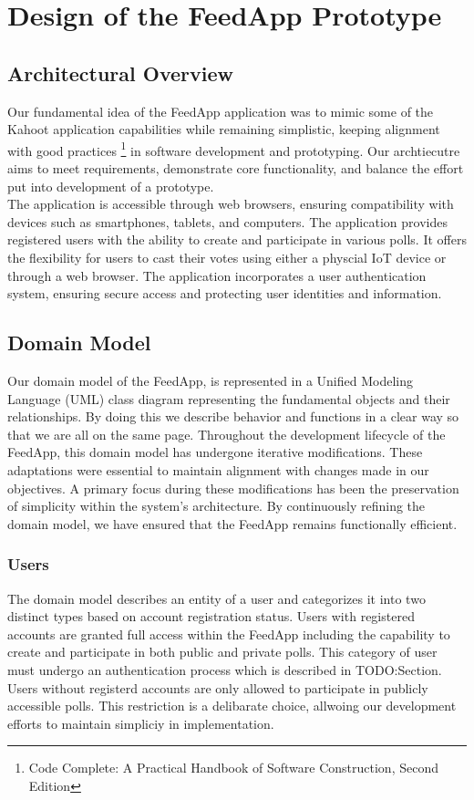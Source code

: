 \clearpage
\section{Design of the FeedApp Prototype}
\label{sec:design}

\subsection{Architectural Overview} 

Our fundamental idea of the FeedApp application was to mimic some of the Kahoot application capabilities while remaining simplistic, keeping alignment with good practices \footnote{Code Complete: A Practical Handbook of Software Construction, Second Edition } in software development and prototyping.  Our archtiecutre aims to meet requirements, demonstrate core functionality, and balance the effort put into development of a prototype.  \\

\noindent The application is accessible through web browsers, ensuring compatibility with devices such as smartphones, tablets, and computers.  The application provides registered users with the ability to create and participate in various polls.  It offers the flexibility for users to cast their votes using either a physcial IoT device or through a web browser.  The application incorporates a user authentication system, ensuring secure access and protecting user identities and information.

\subsection{Domain Model} 
Our domain model of the FeedApp, is represented in a Unified Modeling Language (UML) class diagram representing the fundamental objects and their relationships. By doing this we describe  behavior and functions in a clear way so that we are all on the same page.  Throughout the development lifecycle of the FeedApp, this domain model has undergone iterative modifications. These adaptations were essential to maintain alignment with changes made in our objectives.  A primary focus during these modifications has been the preservation of simplicity within the system's architecture. By continuously refining the domain model, we have ensured that the FeedApp remains functionally efficient.

\subsubsection{Users}
The domain model describes an entity of a user and categorizes it into two distinct types based on account registration status.  Users with registered accounts are granted full access within the FeedApp including the capability to create and participate in both public and private polls.  This category of user must undergo an authentication process which is described in TODO:Section.  Users without registerd accounts are only allowed to participate in publicly accessible  polls.  This restriction is a delibarate choice, allwoing our development efforts to maintain simpliciy in implementation.  

